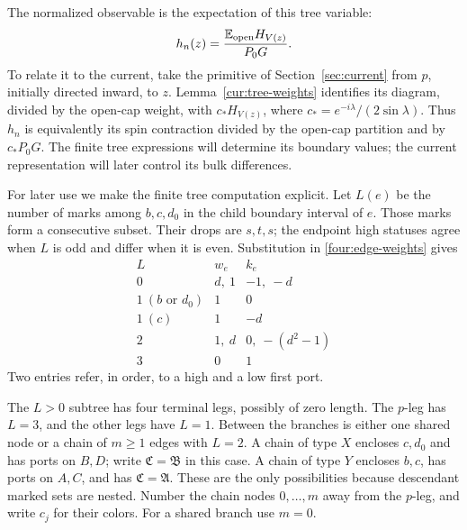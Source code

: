 The normalized observable is the expectation of this tree variable:
\begin{equation}
 h_n(z)=\frac{\mathbb E_{\rm open}H_{V(z)}}{P_0G}.
 \label{four:observable}
\end{equation}
To relate it to the current, take the primitive of
Section~\ref{sec:current} from $p$, initially directed inward, to $z$.
Lemma~\ref{cur:tree-weights} identifies its diagram, divided by the
open-cap weight, with $c_*H_{V(z)}$, where
$c_*=e^{-i\lambda}/(2\sin\lambda)$.  Thus $h_n$ is equivalently its
spin contraction divided by the open-cap partition and by $c_*P_0G$.
The finite tree expressions will determine its boundary values; the
current representation will later control its bulk differences.



For later use we make the finite tree computation explicit.  Let $L(e)$
be the number of marks among $b,c,d_0$ in the child boundary interval of
$e$.  Those marks form a consecutive subset.  Their drops are $s,t,s$;
the endpoint high statuses agree when $L$ is odd and differ when it is
even.  Substitution in \eqref{four:edge-weights} gives
\begin{equation}
\begin{array}{c|cc}
 L&w_e&k_e\\ \hline
 0&d,\ 1&-1,\ -d\\
 1\ (b\text{ or }d_0)&1&0\\
 1\ (c)&1&-d\\
 2&1,\ d&0,\ -(d^2-1)\\
 3&0&1
\end{array}
\label{four:table}
\end{equation}
Two entries refer, in order, to a high and a low first port.

The $L>0$ subtree has four terminal legs, possibly of zero length.
The $p$-leg has $L=3$, and the other legs have $L=1$.  Between the
branches is either one shared node or a chain of $m\ge1$ edges with
$L=2$.  A chain of type $X$ encloses $c,d_0$ and has ports on $B,D$;
write $\mathfrak C=\mathfrak B$ in this case.  A chain of type $Y$
encloses $b,c$, has ports on $A,C$, and has $\mathfrak C=\mathfrak A$.
These are the only possibilities because descendant marked sets are
nested.  Number the chain nodes $0,\ldots,m$ away from the $p$-leg,
and write $c_j$ for their colors.  For a shared branch use $m=0$.

